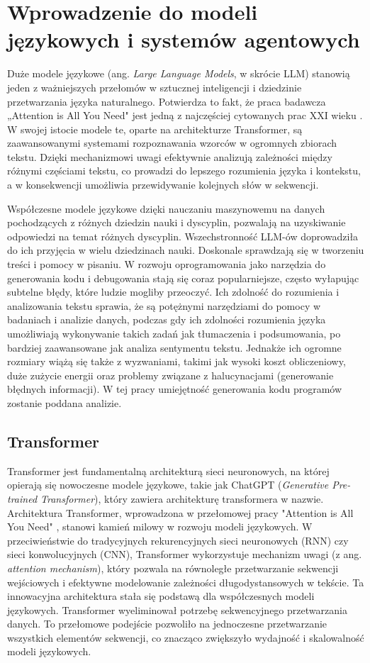 \newpage
\section{Wprowadzenie do modeli językowych i systemów agentowych}
Duże modele językowe (ang. \textit{Large Language Models}, w skrócie LLM) stanowią jeden z ważniejszych przełomów w sztucznej inteligencji i dziedzinie przetwarzania języka naturalnego. Potwierdza to fakt, że praca badawcza „Attention is All You Need" \cite{vaswani2023attentionneed} jest jedną z najczęściej cytowanych prac XXI wieku \cite{wikipediaAttentionNeed}. W swojej istocie modele te, oparte na architekturze Transformer, są zaawansowanymi systemami rozpoznawania wzorców w ogromnych zbiorach tekstu. Dzięki mechanizmowi uwagi efektywnie analizują zależności między różnymi częściami tekstu, co prowadzi do lepszego rozumienia języka i kontekstu, a w konsekwencji umożliwia przewidywanie kolejnych słów w sekwencji.

Współczesne modele językowe dzięki nauczaniu maszynowemu na danych pochodzących z różnych dziedzin nauki i dyscyplin, pozwalają na uzyskiwanie odpowiedzi na temat różnych dyscyplin. Wszechstronność LLM-ów doprowadziła do ich przyjęcia w wielu dziedzinach nauki. Doskonale sprawdzają się w tworzeniu treści i pomocy w pisaniu. W rozwoju oprogramowania jako narzędzia do generowania kodu i debugowania stają się coraz popularniejsze, często wyłapując subtelne błędy, które ludzie mogliby przeoczyć. Ich zdolność do rozumienia i analizowania tekstu sprawia, że są potężnymi narzędziami do pomocy w badaniach i analizie danych, podczas gdy ich zdolności rozumienia języka umożliwiają wykonywanie takich zadań jak tłumaczenia i podsumowania, po bardziej zaawansowane jak analiza sentymentu tekstu. Jednakże ich ogromne rozmiary wiążą się także z wyzwaniami, takimi jak wysoki koszt obliczeniowy, duże zużycie energii oraz problemy związane z halucynacjami (generowanie błędnych informacji). W tej pracy umiejętność generowania kodu programów zostanie poddana analizie.

\subsection{Transformer}
Transformer jest fundamentalną architekturą sieci neuronowych, na której opierają się nowoczesne modele językowe, takie jak ChatGPT (\textit{Generative Pre-trained Transformer}), który zawiera architekturę transformera w nazwie. Architektura Transformer, wprowadzona w przełomowej pracy "Attention is All You Need" \cite{vaswani2023attentionneed}, stanowi kamień milowy w rozwoju modeli językowych. W przeciwieństwie do tradycyjnych rekurencyjnych sieci neuronowych (RNN) czy sieci konwolucyjnych (CNN), Transformer wykorzystuje mechanizm uwagi (z ang. \textit{attention mechanism}), który pozwala na równoległe przetwarzanie sekwencji wejściowych i efektywne modelowanie zależności długodystansowych w tekście. Ta innowacyjna architektura stała się podstawą dla współczesnych modeli językowych. Transformer wyeliminował potrzebę sekwencyjnego przetwarzania danych. To przełomowe podejście pozwoliło na jednoczesne przetwarzanie wszystkich elementów sekwencji, co znacząco zwiększyło wydajność i skalowalność modeli językowych.\cite{natural-lang-process-transf22}

